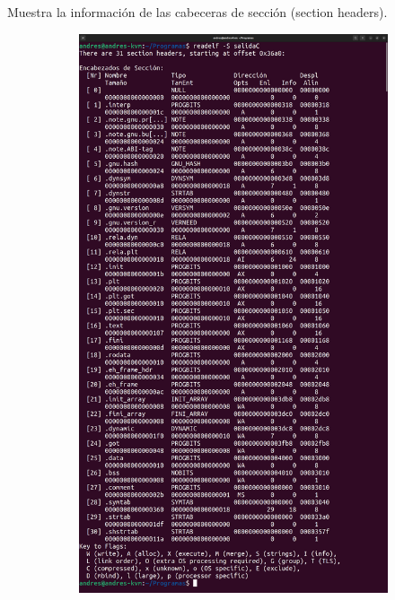 \documentclass{article}
\begin{document}
\begin{itemize}
    Muestra la información de las cabeceras de sección (section headers).

    \begin{figure}[H]
        \centering
        \begin{subfigure}{0.49\textwidth}
            \centering
            \includegraphics[width=\textwidth]{imagenes/C/merged.png}
        \end{subfigure}
        \hfill

\end{figure}
\end{itemize}
\end{document}
